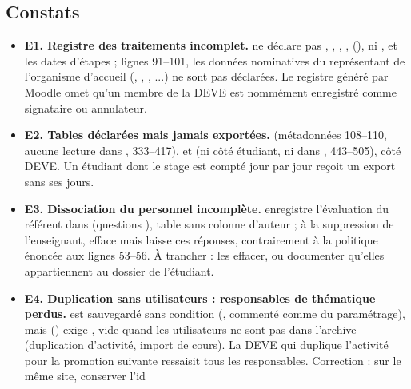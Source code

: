 \documentclass[11pt,a4paper]{article}
\newcommand{\grav}[1]{\textbf{\textcolor{#1}{\textbullet}}}
\newcommand{\maj}{\grav{orange}}
\begin{document}
\subsection{Constats}

\begin{itemize}
  \item[\maj] \textbf{E1. Registre des traitements incomplet.}  ne
    déclare pas , ,
    , , 
    (), ni ,  et les
    dates d'étapes ; lignes 91--101, les données nominatives du représentant de l'organisme
    d'accueil (, , ,
    ...) ne sont pas déclarées. Le registre généré par Moodle omet qu'un membre
    de la DEVE est nommément enregistré comme signataire ou annulateur.
  \item[\maj] \textbf{E2. Tables déclarées mais jamais exportées.} 
    (métadonnées 108--110, aucune lecture dans , 333--417),
     et  (ni côté étudiant, ni dans
    , 443--505),  côté DEVE. Un
    étudiant dont le stage est compté jour par jour reçoit un export sans ses jours.
  \item[\maj] \textbf{E3. Dissociation du personnel incomplète.} 
    enregistre l'évaluation du référent dans  (questions ),
    table sans colonne d'auteur ; à la suppression de l'enseignant, 
    efface  mais laisse ces réponses, contrairement à la politique énoncée aux
    lignes 53--56. À trancher : les effacer, ou documenter qu'elles appartiennent au dossier de
    l'étudiant.
  \item[\maj] \textbf{E4. Duplication sans utilisateurs : responsables de thématique perdus.}
     est sauvegardé sans condition
    (, commenté comme du paramétrage), mais
     () exige
    , vide quand les utilisateurs ne sont pas dans l'archive
    (duplication d'activité, import de cours). La DEVE qui duplique l'activité pour la promotion
    suivante ressaisit tous les responsables. Correction : sur le même site, conserver l'id

\end{itemize}
\end{document}
